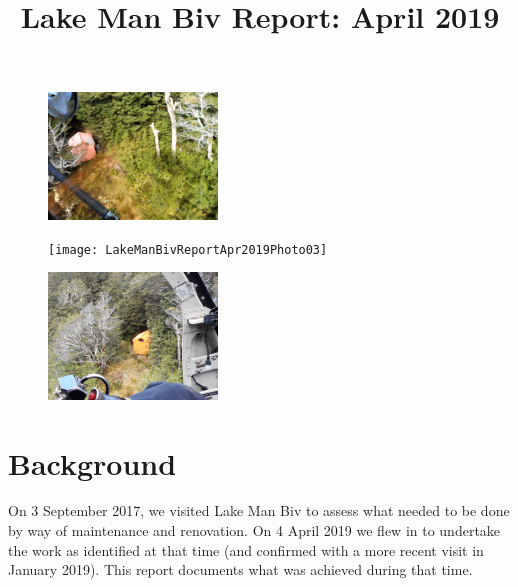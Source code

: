 \documentclass[12pt]{article} %
\title{Lake Man Biv Report: April 2019}
\makeatletter
\renewcommand{\maketitle}{%
  {\bfseries{\scshape{\Large{\@title\par}}}}
}
\makeatother
\begin{document}
  \maketitle

\begin{figure}[t]
\begin{minipage}{.3\linewidth}
\begin{flushleft} 
   \includegraphics[width=4.5cm]{LakeManBivReportApr2019Photo01}
\end{flushleft} 
\end{minipage}
\begin{minipage}{.3\linewidth}
\begin{center} 
   \texttt{[image: LakeManBivReportApr2019Photo03]}
\end{center} 
\end{minipage}
\hspace{.05\linewidth}
\begin{minipage}{.3\linewidth}
\begin{flushright} 
    \includegraphics[width=4.5cm]{LakeManBivReportApr2019Photo02}
\end{flushright} 
\end{minipage}
\end{figure}

\section{Background}

On 3 September 2017, we visited Lake Man Biv to assess what needed to be done by way of maintenance and renovation.  On 4 April 2019 we flew in to undertake the work as identified at that time (and confirmed with a more recent visit in January 2019).  This report documents what was achieved during that time.
\end{document}
